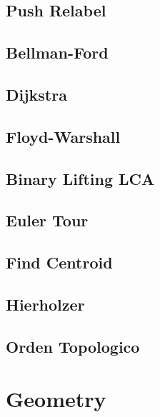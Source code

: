 \subsection{Push Relabel}
\raggedbottom
\hrulefill
\subsection{Bellman-Ford}
\raggedbottom
\hrulefill
\subsection{Dijkstra}
\raggedbottom
\hrulefill
\subsection{Floyd-Warshall}
\raggedbottom
\hrulefill
\subsection{Binary Lifting LCA}
\raggedbottom
\hrulefill
\subsection{Euler Tour}
\raggedbottom
\hrulefill
\subsection{Find Centroid}
\raggedbottom
\hrulefill
\subsection{Hierholzer}
\raggedbottom
\hrulefill
\subsection{Orden Topologico}
\raggedbottom
\hrulefill
\newpage

\section{Geometry}
